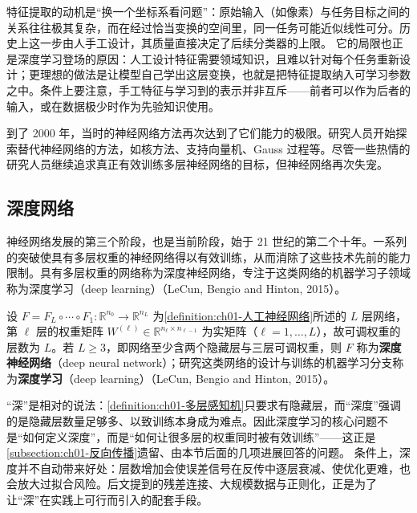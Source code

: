 \documentclass[../../main.tex]{subfiles}
\begin{document}
\begin{remark}
特征提取的动机是“换一个坐标系看问题”：原始输入（如像素）与任务目标之间的关系往往极其复杂，而在经过恰当变换的空间里，同一任务可能近似线性可分。历史上这一步由人手工设计，其质量直接决定了后续分类器的上限。
它的局限也正是深度学习登场的原因：人工设计特征需要领域知识，且难以针对每个任务重新设计；更理想的做法是让模型自己学出这层变换，也就是把特征提取纳入可学习参数之中。条件上要注意，手工特征与学习到的表示并非互斥——前者可以作为后者的输入，或在数据极少时作为先验知识使用。
\end{remark}

到了 2000 年，当时的神经网络方法再次达到了它们能力的极限。研究人员开始探索替代神经网络的方法，如核方法、支持向量机、Gauss 过程等。尽管一些热情的研究人员继续追求真正有效训练多层神经网络的目标，但神经网络再次失宠。

\subsection{深度网络}\label{subsection:ch01-深度网络}

神经网络发展的第三个阶段，也是当前阶段，始于 21 世纪的第二个十年。一系列的突破使具有多层权重的神经网络得以有效训练，从而消除了这些技术先前的能力限制。具有多层权重的网络称为深度神经网络，专注于这类网络的机器学习子领域称为深度学习（deep learning）（LeCun, Bengio and Hinton, 2015）。

\begin{definition}[深度神经网络与深度学习]\label{definition:ch01-深度神经网络与深度学习}
设 $F=F_{L}\circ\cdots\circ F_{1}:\mathbb{R}^{n_{0}}\to\mathbb{R}^{n_{L}}$ 为\cref{definition:ch01-人工神经网络}所述的 $L$ 层网络，第 $\ell$ 层的权重矩阵 $W^{(\ell)}\in\mathbb{R}^{n_{\ell}\times n_{\ell-1}}$ 为实矩阵（$\ell=1,\dots,L$），故可调权重的层数为 $L$。若 $L\geqslant3$，即网络至少含两个隐藏层与三层可调权重，则 $F$ 称为\textbf{深度神经网络}（deep neural network）；研究这类网络的设计与训练的机器学习分支称为\textbf{深度学习}（deep learning）（LeCun, Bengio and Hinton, 2015）。
\end{definition}

\begin{remark}
“深”是相对的说法：\cref{definition:ch01-多层感知机}只要求有隐藏层，而“深度”强调的是隐藏层数量足够多、以致训练本身成为难点。因此深度学习的核心问题不是“如何定义深度”，而是“如何让很多层的权重同时被有效训练”——这正是\cref{subsection:ch01-反向传播}遗留、由本节后面的几项进展回答的问题。
条件上，深度并不自动带来好处：层数增加会使误差信号在反传中逐层衰减、使优化更难，也会放大过拟合风险。后文提到的残差连接、大规模数据与正则化，正是为了让“深”在实践上可行而引入的配套手段。
\end{remark}
\end{document}

